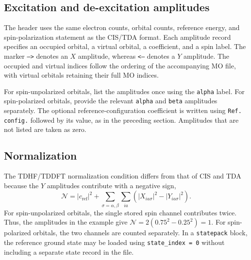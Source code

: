 \subsection*{Excitation and de-excitation amplitudes}
The header uses the same electron counts, orbital counts, reference energy, and spin-polarization statement as the CIS/TDA format. Each amplitude record specifies an occupied orbital, a virtual orbital, a coefficient, and a spin label. The marker \texttt{-->} denotes an $X$ amplitude, whereas \texttt{<--} denotes a $Y$ amplitude. The occupied and virtual indices follow the ordering of the accompanying MO file, with virtual orbitals retaining their full MO indices.

For spin-unpolarized orbitals, list the amplitudes once using the \texttt{alpha} label. For spin-polarized orbitals, provide the relevant \texttt{alpha} and \texttt{beta} amplitudes separately. The optional reference-configuration coefficient is written using \texttt{Ref. config.} followed by its value, as in the preceding section. Amplitudes that are not listed are taken as zero.

\subsection*{Normalization}
The TDHF/TDDFT normalization condition differs from that of CIS and TDA because the $Y$ amplitudes contribute with a negative sign,
\begin{equation}
\mathcal{N}=|c_{\mathrm{ref}}|^2+
\sum_{\sigma=\alpha,\beta}\sum_{ia}
\left(|X_{ia\sigma}|^2-|Y_{ia\sigma}|^2\right).
\end{equation}
For spin-unpolarized orbitals, the single stored spin channel contributes twice. Thus, the amplitudes in the example give $\mathcal{N}=2(0.75^2-0.25^2)=1$. For spin-polarized orbitals, the two channels are counted separately. In a \texttt{statepack} block, the reference ground state may be loaded using \texttt{state\_index = 0} without including a separate state record in the file.
